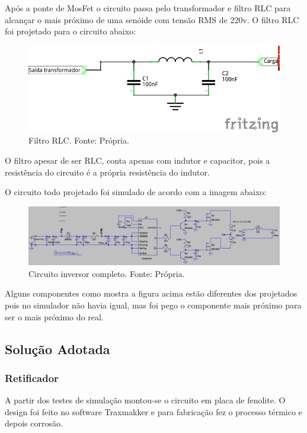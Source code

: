        Após a ponte de MosFet o circuito passa pelo transformador e filtro RLC para 					alcançar o mais próximo de uma senóide com tensão RMS de 220v. O filtro RLC 					foi projetado para o circuito abaixo:	

        \begin{figure}[!htb]
            \centering
            \includegraphics[scale= 1.0]{figuras/Filtro_RLC.png}
            \caption{Filtro RLC. Fonte: Própria.}
            \label{rlc}
        \end{figure}  				
        
        O filtro apesar de ser RLC, conta apenas com indutor e capacitor, pois a 						resistência do circuito é a própria resistência do indutor.
        
        O circuito todo projetado foi simulado de acordo com a imagem abaixo:
        
        \begin{figure}[!htb]
            \centering
            \includegraphics[scale= 0.4]{figuras/Circuito_inversor.png}
            \caption{Circuito inversor completo. Fonte: Própria.}
            \label{inversor}
        \end{figure} 
                        
        Alguns componentes como mostra a figura acima estão diferentes dos projetados 					pois no simulador não havia igual, mas foi pego o componente mais próximo para 				ser o mais próximo do real.          
     
\subsection[Solução Adotada]{Solução Adotada}
    \subsubsection[Retificador]{Retificador} 
        A partir dos testes de simulação montou-se o circuito em placa de fenolite. O 					design foi feito no software Traxmakker e para fabricação fez o processo 						térmico e depois corrosão.	
        
